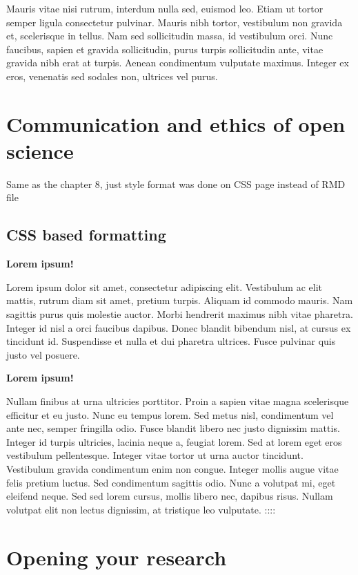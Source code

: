 \documentclass[
]{book}
\begin{document}
Mauris vitae nisi rutrum, interdum nulla sed, euismod leo. Etiam ut tortor semper ligula consectetur pulvinar. Mauris nibh tortor, vestibulum non gravida et, scelerisque in tellus. Nam sed sollicitudin massa, id vestibulum orci. Nunc faucibus, sapien et gravida sollicitudin, purus turpis sollicitudin ante, vitae gravida nibh erat at turpis. Aenean condimentum vulputate maximus. Integer ex eros, venenatis sed sodales non, ultrices vel purus.

\hypertarget{communication-and-ethics-of-open-science}{%
\chapter{Communication and ethics of open science}\label{communication-and-ethics-of-open-science}}

Same as the chapter 8, just style format was done on CSS page instead of RMD file

\hypertarget{css-based-formatting}{%
\section{CSS based formatting}\label{css-based-formatting}}

\textbf{Lorem ipsum!}

Lorem ipsum dolor sit amet, consectetur adipiscing elit. Vestibulum ac elit mattis, rutrum diam sit amet, pretium turpis. Aliquam id commodo mauris. Nam sagittis purus quis molestie auctor. Morbi hendrerit maximus nibh vitae pharetra. Integer id nisl a orci faucibus dapibus. Donec blandit bibendum nisl, at cursus ex tincidunt id. Suspendisse et nulla et dui pharetra ultrices. Fusce pulvinar quis justo vel posuere.

\textbf{Lorem ipsum!}

Nullam finibus at urna ultricies porttitor. Proin a sapien vitae magna scelerisque efficitur et eu justo. Nunc eu tempus lorem. Sed metus nisl, condimentum vel ante nec, semper fringilla odio. Fusce blandit libero nec justo dignissim mattis. Integer id turpis ultricies, lacinia neque a, feugiat lorem. Sed at lorem eget eros vestibulum pellentesque. Integer vitae tortor ut urna auctor tincidunt. Vestibulum gravida condimentum enim non congue. Integer mollis augue vitae felis pretium luctus. Sed condimentum sagittis odio. Nunc a volutpat mi, eget eleifend neque. Sed sed lorem cursus, mollis libero nec, dapibus risus. Nullam volutpat elit non lectus dignissim, at tristique leo vulputate.
::::

\hypertarget{opening-your-research}{%
\chapter{Opening your research}\label{opening-your-research}}
\end{document}
